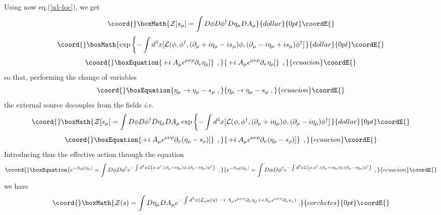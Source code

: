 \documentclass[a4paper,12pt]{article}
\begin{document}
\noindent Using now eq.(\ref{u1-loc}), we get
$$\coord{}\boxMath{
{\cal Z}[s_\mu]=\int D\phi D\phi ^{\dagger }D\eta _\mu DA_\mu }{dollar}{0pt}\coordE{}$$  $$\coord{}\boxMath{
\exp \left\{-\int d^3x [ {\cal L}( \phi ,\phi ^{\dagger }, (\partial _\mu +i\eta _\mu -is_\mu )\phi
  ,(\partial _\mu -i\eta _\mu +is_\mu ) \phi ^\dagger ]\right.
}{dollar}{0pt}\coordE{}$$
\begin{equation}\coord{}\boxEquation{
\left. + i \;A_\mu \epsilon ^{\mu \nu \rho }\partial _\nu \eta_\rho ] \right\}\;,
}{
\left. + i \;A_\mu \epsilon ^{\mu \nu \rho }\partial _\nu \eta_\rho ] \right\}\;,
}{ecuacion}\coordE{}\end{equation}
so that, performing the change of variables
\begin{equation}\coord{}\boxEquation{
\label{change}
\eta _\mu \to \eta _\mu - s_\mu \;,
}{
\eta _\mu \to \eta _\mu - s_\mu \;,
}{ecuacion}\coordE{}\end{equation}
the external source \coordHE{} decouples from the fields \myHighlight{$\phi ,\phi
^{\dagger },$}\coordHE{} {\it i.e.}
$$\coord{}\boxMath{
{\cal Z}[s_\mu]=\int D\phi D\phi ^{\dagger }D\eta _\mu DA_\mu \exp \left\{-\int d^3x [ {\cal
    L}( \phi ,\phi ^{\dagger },(\partial _\mu +i\eta_\mu)\phi ,(\partial_\mu -i\eta_\mu)\phi ^{\dagger }]\right.
}{dollar}{0pt}\coordE{}$$
\begin{equation}\coord{}\boxEquation{
\label{g-f3}
\left. + i \;A_\mu \epsilon ^{\mu \nu \rho }\partial _\nu (\eta_\rho - s_\rho )] \right\}\;,
}{
\left. + i \;A_\mu \epsilon ^{\mu \nu \rho }\partial _\nu (\eta_\rho - s_\rho )] \right\}\;,
}{ecuacion}\coordE{}\end{equation}
Introducing thus the effective action \coordHE{}through the equation
\begin{equation}\coord{}\boxEquation{
e^{-S_{{\rm eff}}[\eta_\mu ]}=\int D\phi D\phi ^{\dagger }e^{-\int d^3x{\cal L}
\left( \phi ,\phi ^{\dagger },(\partial _\mu +i\eta _\mu )\phi ,(\partial
_\mu -i\eta _\mu )\phi ^{\dagger }\right) \;\;},  \label{eff-act}
}{
e^{-S_{{\rm eff}}[\eta_\mu ]}=\int D\phi D\phi ^{\dagger }e^{-\int d^3x{\cal L}
\left( \phi ,\phi ^{\dagger },(\partial _\mu +i\eta _\mu )\phi ,(\partial
_\mu -i\eta _\mu )\phi ^{\dagger }\right) \;\;},  }{ecuacion}\coordE{}\end{equation}
we have
\[\coord{}\boxMath{
{\cal Z}(s)=\int D\eta _\mu DA_\mu e^{-\int d^3x\left( {\cal L}_{%
      {\rm eff}}(\eta )\;-i\;A_\mu \epsilon ^{\mu \nu \rho }\partial
    _\nu \eta _\rho + i A_\mu \epsilon ^{\mu \nu \rho }\partial _\nu
    s_\rho \right) \;}.
}{corchetes}{0pt}\coordE{}\]
\end{document}

